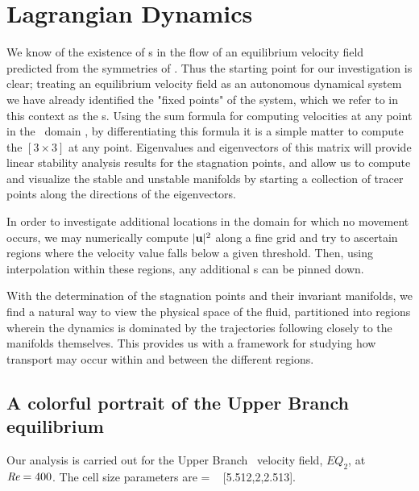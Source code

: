 \documentclass[letter,12pt,openany]{article}
\begin{document}
 
 



\section{\centering Lagrangian Dynamics}
\label{sec:Lagrangian}


We know of the existence of  \stagp s in the flow of an equilibrium velocity field
predicted from the symmetries of \pCf. Thus the starting point for our investigation is clear; treating an equilibrium velocity field as an autonomous dynamical system we have already identified the "fixed points" of the system, which we refer to in this context as the \stagp s.  Using the sum formula for computing velocities at
any point in the \pCf\ domain , by differentiating this formula it is a simple
matter to compute the $[3\!\times\! 3]$ {\velgradmat}
at any point. Eigenvalues and eigenvectors of this matrix will
provide linear stability analysis results for the stagnation points, and allow us to compute and visualize the stable
and unstable manifolds by starting a collection of tracer points along the directions of the eigenvectors. 


 In order to investigate additional locations in the domain for which no movement occurs, we may numerically compute $|{\bf u}|^{2}$ along a fine
grid and try to ascertain regions where the velocity value falls below a given threshold. Then,
using interpolation within these regions, any additional  \stagp s can be
pinned down. 

With the determination of the stagnation points and their invariant manifolds, we find a natural way to view the physical space of the fluid, partitioned into regions wherein the dynamics is dominated by the trajectories following closely to the manifolds themselves. This provides us with a framework for studying how transport may occur within and between the different regions.






\subsection{A colorful portrait of the Upper Branch equilibrium}
\label{sec:eq2}


Our analysis is carried out for the 
Upper Branch \eqv\ velocity field, $EQ_2$, at $\textit{Re} = 400$.
The cell size parameters are \beq   [L_x,2,L_z]
         = \; [2\pi/1.14,2,4\pi/5]
         ~ [5.512,2,2.513].
\label{cellW03}
\eeq
\end{document}
